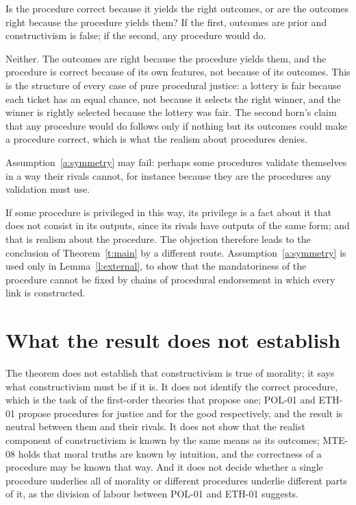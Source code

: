 \documentclass{situationist-preprint}
\begin{document}
\begin{objection}
Is the procedure correct because it yields the right outcomes, or are the outcomes right because the procedure yields them? If the first, outcomes are prior and constructivism is false; if the second, any procedure would do.
\end{objection}

\begin{reply}
Neither. The outcomes are right because the procedure yields them, and the procedure is correct because of its own features, not because of its outcomes. This is the structure of every case of pure procedural justice: a lottery is fair because each ticket has an equal chance, not because it selects the right winner, and the winner is rightly selected because the lottery was fair. The second horn's claim that any procedure would do follows only if nothing but its outcomes could make a procedure correct, which is what the realism about procedures denies.
\end{reply}

\begin{objection}
Assumption~\ref{a:symmetry} may fail: perhaps some procedures validate themselves in a way their rivals cannot, for instance because they are the procedures any validation must use.
\end{objection}

\begin{reply}
If some procedure is privileged in this way, its privilege is a fact about it that does not consist in its outputs, since its rivals have outputs of the same form; and that is realism about the procedure. The objection therefore leads to the conclusion of Theorem~\ref{t:main} by a different route. Assumption~\ref{a:symmetry} is used only in Lemma~\ref{l:external}, to show that the mandatoriness of the procedure cannot be fixed by chains of procedural endorsement in which every link is constructed.
\end{reply}

\section{What the result does not establish}

The theorem does not establish that constructivism is true of morality; it says what constructivism must be if it is. It does not identify the correct procedure, which is the task of the first-order theories that propose one; POL-01 and ETH-01 propose procedures for justice and for the good respectively, and the result is neutral between them and their rivals. It does not show that the realist component of constructivism is known by the same means as its outcomes; MTE-08 holds that moral truths are known by intuition, and the correctness of a procedure may be known that way. And it does not decide whether a single procedure underlies all of morality or different procedures underlie different parts of it, as the division of labour between POL-01 and ETH-01 suggests.
\end{document}
